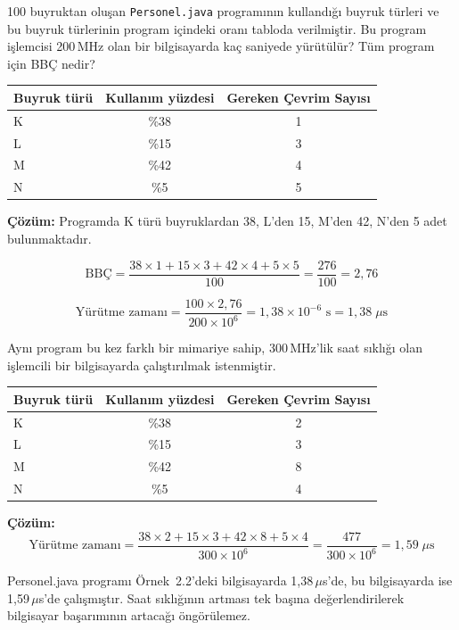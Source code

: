 \begin{ornek}[2.2]
100 buyruktan oluşan \texttt{Personel.java} programının kullandığı buyruk türleri ve bu buyruk türlerinin program içindeki oranı tabloda verilmiştir. Bu program işlemcisi 200\,MHz olan bir bilgisayarda kaç saniyede yürütülür? Tüm program için BBÇ nedir?

\begin{center}
\begin{tabular}{lcc}
\toprule
\textbf{Buyruk türü} & \textbf{Kullanım yüzdesi} & \textbf{Gereken Çevrim Sayısı} \\
\midrule
K & \%38 & 1 \\
L & \%15 & 3 \\
M & \%42 & 4 \\
N & \%5  & 5 \\
\bottomrule
\end{tabular}
\end{center}

\textbf{Çözüm:} Programda K türü buyruklardan 38, L'den 15, M'den 42, N'den 5 adet bulunmaktadır.

\[
\text{BBÇ} = \frac{38 \times 1 + 15 \times 3 + 42 \times 4 + 5 \times 5}{100} = \frac{276}{100} = 2{,}76
\]

\[
\text{Yürütme zamanı} = \frac{100 \times 2{,}76}{200 \times 10^6} = 1{,}38 \times 10^{-6} \text{ s} = 1{,}38 \; \mu\text{s}
\]
\end{ornek}


\begin{ornek}[2.3]
Aynı program bu kez farklı bir mimariye sahip, 300\,MHz'lik saat sıklığı olan işlemcili bir bilgisayarda çalıştırılmak istenmiştir.

\begin{center}
\begin{tabular}{lcc}
\toprule
\textbf{Buyruk türü} & \textbf{Kullanım yüzdesi} & \textbf{Gereken Çevrim Sayısı} \\
\midrule
K & \%38 & 2 \\
L & \%15 & 3 \\
M & \%42 & 8 \\
N & \%5  & 4 \\
\bottomrule
\end{tabular}
\end{center}

\textbf{Çözüm:}
\[
\text{Yürütme zamanı} = \frac{38 \times 2 + 15 \times 3 + 42 \times 8 + 5 \times 4}{300 \times 10^6} = \frac{477}{300 \times 10^6} = 1{,}59 \; \mu\text{s}
\]

Personel.java programı Örnek~2.2'deki bilgisayarda 1,38\,$\mu$s'de, bu bilgisayarda ise 1,59\,$\mu$s'de çalışmıştır. Saat sıklığının artması tek başına değerlendirilerek bilgisayar başarımının artacağı öngörülemez.
\end{ornek}


